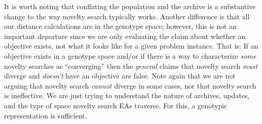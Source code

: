 \documentclass[twoside]{article}
\begin{document}
It is worth noting that conflating the population and the archive is a substantive change to the way novelty search typically works.  Another difference is that all our distance calculations are in the genotype space; however, this is not an important departure since we are only evaluating the claim about whether an objective exists, not what it looks like for a given problem instance.  That is:  If an objective exists in a genotype space and/or if there is a way to characterize \emph{some} novelty searches as ``converging'' then the \emph{general} claims that novelty search \emph{must} diverge and \emph{doesn't} have an objective are false.  Note again that we are not arguing that novelty search \emph{cannot} diverge in some cases, nor that novelty search is ineffective.  We are just trying to understand the nature of archives, updates, and the type of space novelty search EAs traverse.  For this, a genotypic representation is sufficient.


\end{document}
